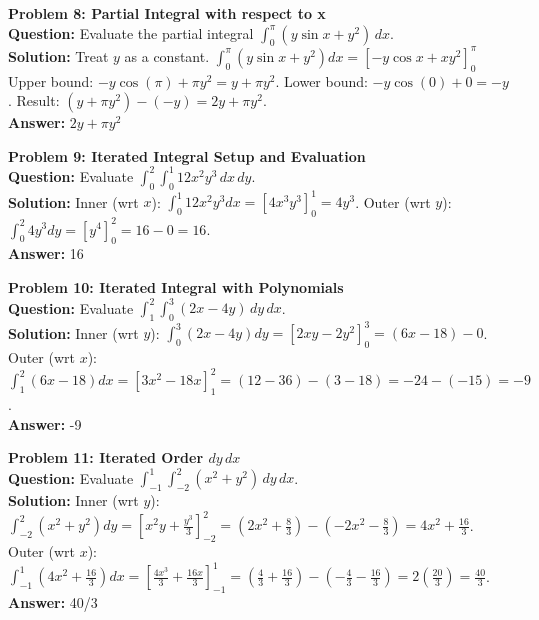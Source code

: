 \documentclass[11pt]{article}
\begin{document}
\vspace{0.5cm}
\noindent\textbf{Problem 8: Partial Integral with respect to x} \\
\textbf{Question:} Evaluate the partial integral $\int_0^{\pi} (y \sin x + y^2) \, dx$. \\
\textbf{Solution:} Treat $y$ as a constant.
$\int_0^{\pi} (y \sin x + y^2) dx = \left[ -y \cos x + xy^2 \right]_{0}^{\pi}$
Upper bound: $-y \cos(\pi) + \pi y^2 = y + \pi y^2$.
Lower bound: $-y \cos(0) + 0 = -y$.
Result: $(y + \pi y^2) - (-y) = 2y + \pi y^2$. \\
\textbf{Answer:} $2y + \pi y^2$

\vspace{0.5cm}
\noindent\textbf{Problem 9: Iterated Integral Setup and Evaluation} \\
\textbf{Question:} Evaluate $\int_0^2 \int_0^1 12x^2 y^3 \, dx \, dy$. \\
\textbf{Solution:} 
Inner (wrt $x$): $\int_0^1 12x^2 y^3 dx = \left[ 4x^3 y^3 \right]_0^1 = 4y^3$.
Outer (wrt $y$): $\int_0^2 4y^3 dy = \left[ y^4 \right]_0^2 = 16 - 0 = 16$. \\
\textbf{Answer:} 16

\vspace{0.5cm}
\noindent\textbf{Problem 10: Iterated Integral with Polynomials} \\
\textbf{Question:} Evaluate $\int_1^2 \int_0^3 (2x - 4y) \, dy \, dx$. \\
\textbf{Solution:} 
Inner (wrt $y$): $\int_0^3 (2x - 4y) dy = \left[ 2xy - 2y^2 \right]_0^3 = (6x - 18) - 0$.
Outer (wrt $x$): $\int_1^2 (6x - 18) dx = \left[ 3x^2 - 18x \right]_1^2 = (12 - 36) - (3 - 18) = -24 - (-15) = -9$. \\
\textbf{Answer:} -9

\vspace{0.5cm}
\noindent\textbf{Problem 11: Iterated Order $dy \, dx$} \\
\textbf{Question:} Evaluate $\int_{-1}^1 \int_{-2}^2 (x^2 + y^2) \, dy \, dx$. \\
\textbf{Solution:} 
Inner (wrt $y$): $\int_{-2}^2 (x^2 + y^2) dy = \left[ x^2 y + \frac{y^3}{3} \right]_{-2}^2 = (2x^2 + \frac{8}{3}) - (-2x^2 - \frac{8}{3}) = 4x^2 + \frac{16}{3}$.
Outer (wrt $x$): $\int_{-1}^1 (4x^2 + \frac{16}{3}) dx = \left[ \frac{4x^3}{3} + \frac{16x}{3} \right]_{-1}^1 = (\frac{4}{3} + \frac{16}{3}) - (-\frac{4}{3} - \frac{16}{3}) = 2(\frac{20}{3}) = \frac{40}{3}$. \\
\textbf{Answer:} 40/3
\end{document}
